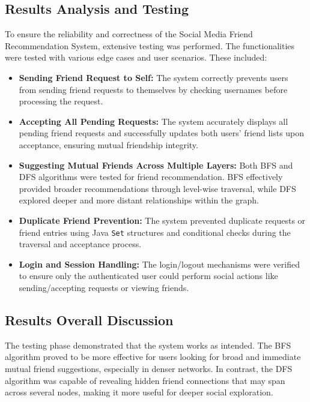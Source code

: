 \documentclass[12pt]{report}
\begin{document}
\subsection{Results Analysis and Testing}

To ensure the reliability and correctness of the Social Media Friend Recommendation System, extensive testing was performed. The functionalities were tested with various edge cases and user scenarios. These included:

\begin{itemize}
    \item \textbf{Sending Friend Request to Self:} The system correctly prevents users from sending friend requests to themselves by checking usernames before processing the request.
    
    \item \textbf{Accepting All Pending Requests:} The system accurately displays all pending friend requests and successfully updates both users' friend lists upon acceptance, ensuring mutual friendship integrity.
    
    \item \textbf{Suggesting Mutual Friends Across Multiple Layers:} Both BFS and DFS algorithms were tested for friend recommendation. BFS effectively provided broader recommendations through level-wise traversal, while DFS explored deeper and more distant relationships within the graph.
    
    \item \textbf{Duplicate Friend Prevention:} The system prevented duplicate requests or friend entries using Java \texttt{Set} structures and conditional checks during the traversal and acceptance process.
    
    \item \textbf{Login and Session Handling:} The login/logout mechanisms were verified to ensure only the authenticated user could perform social actions like sending/accepting requests or viewing friends.
\end{itemize}

\subsection{Results Overall Discussion}

The testing phase demonstrated that the system works as intended. The BFS algorithm proved to be more effective for users looking for broad and immediate mutual friend suggestions, especially in denser networks. In contrast, the DFS algorithm was capable of revealing hidden friend connections that may span across several nodes, making it more useful for deeper social exploration.
\end{document}
